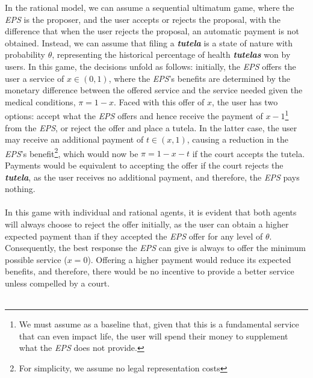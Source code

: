 \documentclass[12pt]{article}
\begin{document}
\begin{flushleft}

    In the rational model, we can assume a sequential ultimatum game, where the \textit{EPS} is the proposer, and the user accepts or rejects the proposal, with the difference that when the user rejects the proposal, an automatic payment is not obtained. Instead, we can assume that filing a \textit{\textbf{tutela}} is a state of nature with probability $\theta$, representing the historical percentage of health \textit{\textbf{tutelas}} won by users. In this game, the decisions unfold as follows: initially, the \textit{EPS} offers the user a service of $x\in(0,1)$, where the \textit{EPS}'s benefits are determined by the monetary difference between the offered service and the service needed given the medical conditions, $\pi=1-x$. Faced with this offer of $x$, the user has two options: accept what the \textit{EPS} offers and hence receive the payment of $x-1$\footnote{We must assume as a baseline that, given that this is a fundamental service that can even impact life, the user will spend their money to supplement what the \textit{EPS} does not provide.} from the \textit{EPS}, or reject the offer and place a tutela. In the latter case, the user may receive an additional payment of $t\in(x,1)$, causing a reduction in the \textit{EPS}'s benefit\footnote{For simplicity, we assume no legal representation costs}, which would now be $\pi=1-x-t$ if the court accepts the tutela. Payments would be equivalent to accepting the offer if the court rejects the \textit{\textbf{tutela}}, as the user receives no additional payment, and therefore, the \textit{EPS} pays nothing.\\~\\

    In this game with individual and rational agents, it is evident that both agents will always choose to reject the offer initially, as the user can obtain a higher expected payment than if they accepted the \textit{EPS} offer for any level of $\theta$. Consequently, the best response the \textit{EPS} can give is always to offer the minimum possible service ($x=0$). Offering a higher payment would reduce its expected benefits, and therefore, there would be no incentive to provide a better service unless compelled by a court.\\~\\


\end{flushleft}
\end{document}

